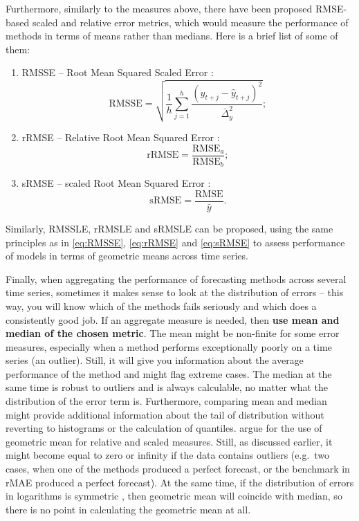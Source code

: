 \documentclass[
]{book}
\providecommand{\tightlist}{%
  \setlength{\itemsep}{0pt}\setlength{\parskip}{0pt}}
\theoremstyle{definition}
\theoremstyle{definition}
\theoremstyle{definition}
\theoremstyle{definition}
\theoremstyle{remark}
\begin{document}
Furthermore, similarly to the measures above, there have been proposed RMSE-based scaled and relative error metrics, which would measure the performance of methods in terms of means rather than medians. Here is a brief list of some of them:

\begin{enumerate}
\def\labelenumi{\arabic{enumi}.}
\tightlist
\item
  RMSSE -- Root Mean Squared Scaled Error \citep{Makridakis2020a}:
  \begin{equation}
   \mathrm{RMSSE} = \sqrt{\frac{1}{h} \sum_{j=1}^h \frac{(y_{t+j} -\hat{y}_{t+j})^2}{\bar{\Delta}_y^2}} ;
   \label{eq:RMSSE}
  \end{equation}
\item
  rRMSE -- Relative Root Mean Squared Error \citep{Stock2004}:
  \begin{equation}
   \mathrm{rRMSE} = \frac{\mathrm{RMSE}_a}{\mathrm{RMSE}_b} ;
   \label{eq:rRMSE}
  \end{equation}
\item
  sRMSE -- scaled Root Mean Squared Error \citep{Petropoulos2015}:
  \begin{equation}
   \mathrm{sRMSE} = \frac{\mathrm{RMSE}}{\bar{y}} .
   \label{eq:sRMSE}
  \end{equation}
\end{enumerate}

Similarly, RMSSLE, rRMSLE and sRMSLE can be proposed, using the same principles as in \eqref{eq:RMSSE}, \eqref{eq:rRMSE} and \eqref{eq:sRMSE} to assess performance of models in terms of geometric means across time series.

Finally, when aggregating the performance of forecasting methods across several time series, sometimes it makes sense to look at the distribution of errors -- this way, you will know which of the methods fails seriously and which does a consistently good job. If an aggregate measure is needed, then \textbf{use mean and median of the chosen metric}. The mean might be non-finite for some error measures, especially when a method performs exceptionally poorly on a time series (an outlier). Still, it will give you information about the average performance of the method and might flag extreme cases. The median at the same time is robust to outliers and is always calculable, no matter what the distribution of the error term is. Furthermore, comparing mean and median might provide additional information about the tail of distribution without reverting to histograms or the calculation of quantiles. \citet{Davydenko2013} argue for the use of geometric mean for relative and scaled measures. Still, as discussed earlier, it might become equal to zero or infinity if the data contains outliers (e.g.~two cases, when one of the methods produced a perfect forecast, or the benchmark in rMAE produced a perfect forecast). At the same time, if the distribution of errors in logarithms is symmetric \citep[which is the main argument of][]{Davydenko2013}, then geometric mean will coincide with median, so there is no point in calculating the geometric mean at all.
\end{document}
